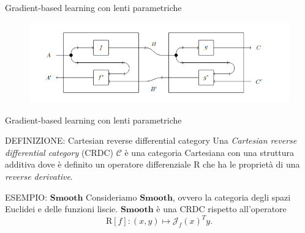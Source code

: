 \documentclass{beamer}
\begin{document}
\begin{frame}{Gradient-based learning con lenti parametriche}
    \begin{figure}
        \begin{center}
            \includegraphics[width=\textwidth]{figures/lens_composition.png}
            \caption*{}
        \end{center}
    \end{figure}
\end{frame}

\begin{frame}{Gradient-based learning con lenti parametriche}
    \begin{block}{DEFINIZIONE: Cartesian reverse differential category}
        Una \textit{Cartesian reverse differential category} (CRDC) $\mathcal{C}$ è una categoria Cartesiana con una struttura additiva dove è definito un operatore differenziale $\mathrm{R}$ che ha le proprietà di una \textit{reverse derivative}.
      \end{block}

      \begin{block}{ESEMPIO: $\mathbf{Smooth}$}
        Consideriamo $\mathbf{Smooth}$, ovvero la categoria degli spazi Euclidei e delle funzioni liscie. $\mathbf{Smooth}$ è una CRDC rispetto all'operatore
        \[\mathrm{R}[f]: (x,y) \mapsto \mathcal{J}_f(x)^Ty.\]
      \end{block}
\end{frame}
\end{document}
